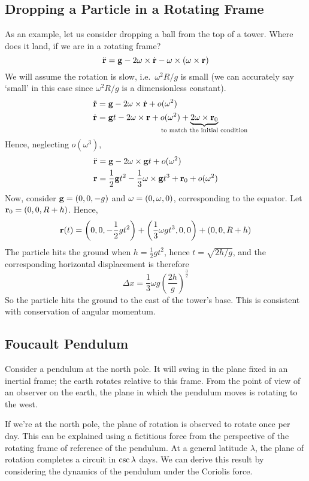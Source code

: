 \subsection{Dropping a Particle in a Rotating Frame}
As an example, let us consider dropping a ball from the top of a tower.
Where does it land, if we are in a rotating frame?
\[
	\ddot{\vb{r}} = \vb g - 2\vb\omega \times \dot{\vb{r}} - \vb\omega \times (\vb\omega \times \vb r)
\]
We will assume the rotation is slow, i.e.\ \(\omega^2 R / g\) is small (we can accurately say `small' in this case since \(\omega^2R/g\) is a dimensionless constant).
\begin{align*}
	\rddot & = \vb g - 2\omega \times \rdot + o(\omega^2)                                                                                          \\
	\rdot  & = \vb gt - 2\omega \times \vb r + o(\omega^2) + \underbrace{2\omega\times \vb r_0}_{\mathclap{\text{to match the initial condition}}}
\end{align*}
Hence, neglecting \(o(\omega^3)\),
\begin{align*}
	\ddot{\vb{r}} & = \vb g - 2\omega \times \vb gt + o(\omega^2)                                       \\
	\vb r  & = \frac{1}{2}\vb gt^2 - \frac{1}{3}\vb\omega\times \vb gt^3 + \vb r_0 + o(\omega^2)
\end{align*}
Now, consider \(\vb g = (0, 0, -g)\) and \(\vb\omega = (0, \omega, 0)\), corresponding to the equator.
Let \(\vb r_0 = (0, 0, R + h)\).
Hence,
\[
	\vb r(t) = \qty(0, 0, -\frac{1}{2}gt^2) + \qty(\frac{1}{3}\omega g t^3, 0, 0) + (0, 0, R + h)
\]
The particle hits the ground when \(h = \frac{1}{2}gt^2\), hence \(t = \sqrt{2h/g}\), and the corresponding horizontal displacement is therefore
\[
	\Delta x = \frac{1}{3}\omega g \left( \frac{2h}{g} \right)^{\frac{3}{2}}
\]
So the particle hits the ground to the east of the tower's base.
This is consistent with conservation of angular momentum.

\subsection{Foucault Pendulum}
Consider a pendulum at the north pole.
It will swing in the plane fixed in an inertial frame; the earth rotates relative to this frame.
From the point of view of an observer on the earth, the plane in which the pendulum moves is rotating to the west.

If we're at the north pole, the plane of rotation is observed to rotate once per day.
This can be explained using a fictitious force from the perspective of the rotating frame of reference of the pendulum.
At a general latitude \(\lambda\), the plane of rotation completes a circuit in \(\cosecant\lambda\) days.
We can derive this result by considering the dynamics of the pendulum under the Coriolis force.
